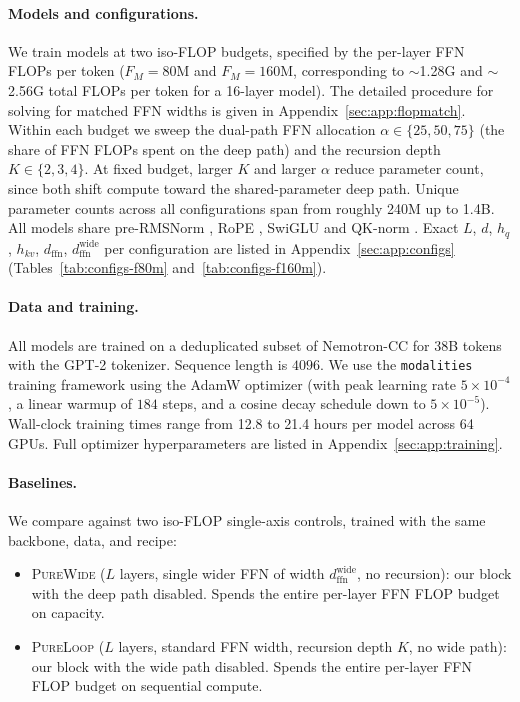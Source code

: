 \documentclass[11pt]{article}
\begin{document}
\paragraph{Models and configurations.}
We train models at two iso-FLOP budgets, specified by the per-layer FFN FLOPs per token ($F_M = 80$M and
$F_M = 160$M, corresponding to $\sim$1.28G and $\sim$2.56G total FLOPs per token for a 16-layer model). The detailed procedure for solving for matched FFN widths is given in Appendix~\ref{sec:app:flopmatch}.  Within each budget we sweep the dual-path FFN allocation $\alpha \in \{25, 50, 75\}$ (the share of FFN FLOPs spent on the deep path) and the recursion depth $K \in \{2, 3, 4\}$.  At fixed budget, larger $K$ and
larger $\alpha$ reduce parameter count, since both shift compute toward the shared-parameter deep path.  Unique parameter counts across all configurations span from roughly 240M up to 1.4B.  All models share pre-RMSNorm \citep{zhang-sennrich-2019-rmsnorm}, RoPE \citep{su-etal-2024-rope}, SwiGLU \citep{shazeer-2020-glu} and QK-norm \citep{henry-etal-2020-qknorm}.  Exact $L$, $d$, $h_q$, $h_{kv}$, $d_{\text{ffn}}$,
$d_{\text{ffn}}^{\text{wide}}$ per configuration are listed in
Appendix~\ref{sec:app:configs} (Tables~\ref{tab:configs-f80m} and~\ref{tab:configs-f160m}).

\paragraph{Data and training.}
All models are trained on a deduplicated subset of Nemotron-CC
\citep{su-etal-2024-nemotron-cc} for 38B tokens with the GPT-2
tokenizer.  Sequence length is $4096$.  We use the
\texttt{modalities} training framework \citep{lubbering2026modalities} using the AdamW optimizer (with peak learning rate $5\times 10^{-4}$, a linear warmup of $184$ steps, and a cosine decay schedule down to $5\times 10^{-5}$). Wall-clock training times range from 12.8 to 21.4 hours per model across 64 GPUs. Full optimizer hyperparameters are listed in Appendix~\ref{sec:app:training}.


\paragraph{Baselines.}
We compare against two iso-FLOP single-axis controls, trained
with the same backbone, data, and recipe:

\begin{itemize}
\item \textsc{PureWide} ($L$ layers, single wider FFN of width
$d_{\text{ffn}}^{\text{wide}}$, no recursion): our block with the
deep path disabled.  Spends the entire per-layer FFN FLOP budget
on capacity.
\item \textsc{PureLoop} ($L$ layers, standard FFN width,
recursion depth $K$, no wide path): our block with the wide path
disabled.  Spends the entire per-layer FFN FLOP budget on
sequential compute.
\end{itemize}
\end{document}
